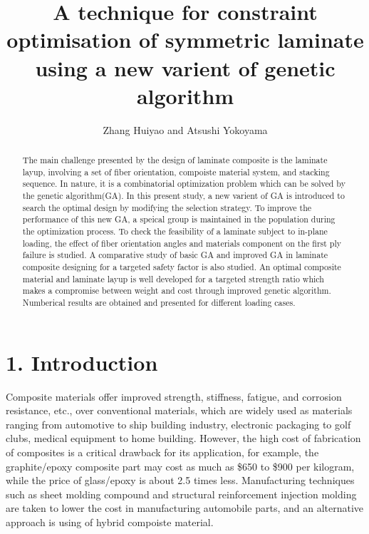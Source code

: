 \documentclass[Afour,sagev,times]{sagej}
\begin{document}
\title{A technique for constraint optimisation of symmetric laminate using a new
varient of genetic algorithm}
\author{Zhang Huiyao and
	Atsushi Yokoyama 
}



\begin{abstract}
The main challenge presented by the design of laminate composite is the laminate layup, involving a
set of fiber orientation, compoiste material system, and stacking sequence. In nature, it is a
combinatorial optimization problem which can be solved by the genetic algorithm(GA). In this present
study, a new varient of GA is introduced to search the optimal design by modifying the selection
strategy. To improve the performance of this new GA, a speical group is maintained in the population
during the optimization process.  To check the feasibility of a laminate subject to in-plane
loading, the effect of fiber orientation angles and materials component on the first ply failure
is studied. A comparative study of basic GA and improved GA in laminate composite designing for
a targeted safety factor is also studied.  An optimal composite material and laminate layup is well
developed for a targeted strength ratio which makes a compromise between weight and cost through
improved genetic algorithm. Numberical results are obtained and presented for different loading
cases.
\end{abstract}


\maketitle

\section{1. Introduction}

Composite materials offer improved strength, stiffness, fatigue, and corrosion resistance, etc., over
conventional materials, which are widely used as materials ranging from automotive to ship building
industry, electronic packaging to golf clubs, medical equipment to home building.  However, the high
cost of fabrication of composites is a critical drawback for its application, for example, the
graphite/epoxy composite part may cost as much as \$650 to \$900 per kilogram, while the price of
glass/epoxy is about 2.5 times less. Manufacturing techniques such as sheet molding
compound and structural reinforcement injection molding are taken to lower the cost in manufacturing
automobile parts, and an alternative approach is using of hybrid compoiste material.
\end{document}
